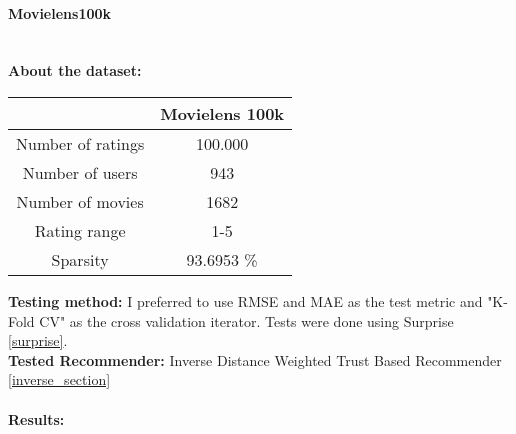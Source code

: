 	\paragraph{Movielens100k \cite{Movielens}} \mbox{}\\
	\textbf{About the dataset:} 
	\begin{center}
		\begin{tabular}{ | c | c |}
			\hline
			&Movielens 100k  \\  
			\hline
			Number of ratings  & 100.000  \\   
			\hline
			Number of users & 943 \\
			\hline
			Number of movies & 1682 \\
			\hline
			Rating range & 1-5 \\
			\hline
			Sparsity & 93.6953 \% \\
			\hline
		\end{tabular}
	\end{center} 
	\vspace{0.5cm}
	\textbf{Testing method:} I preferred to use RMSE and MAE as the test metric and "K-Fold CV" as the cross validation iterator. Tests were done using Surprise \ref{surprise}.\\
	\textbf{Tested Recommender:} Inverse Distance Weighted Trust Based Recommender \ref{inverse_section} \\ \\
	\textbf{Results:}
	
